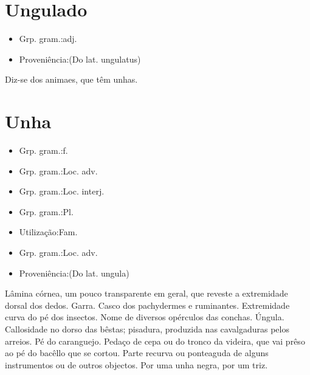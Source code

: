 \documentclass{article}
\begin{document}
\section{Ungulado}
\begin{itemize}
\item {Grp. gram.:adj.}
\end{itemize}
\begin{itemize}
\item {Proveniência:(Do lat. \textunderscore ungulatus\textunderscore )}
\end{itemize}
Diz-se dos animaes, que têm unhas.
\section{Unha}
\begin{itemize}
\item {Grp. gram.:f.}
\end{itemize}
\begin{itemize}
\item {Grp. gram.:Loc. adv.}
\end{itemize}
\begin{itemize}
\item {Grp. gram.:Loc. interj.}
\end{itemize}
\begin{itemize}
\item {Grp. gram.:Pl.}
\end{itemize}
\begin{itemize}
\item {Utilização:Fam.}
\end{itemize}
\begin{itemize}
\item {Grp. gram.:Loc. adv.}
\end{itemize}
\begin{itemize}
\item {Proveniência:(Do lat. \textunderscore ungula\textunderscore )}
\end{itemize}
Lâmina córnea, um pouco transparente em geral, que reveste a extremidade dorsal dos dedos.
Garra.
Casco dos pachydermes e ruminantes.
Extremidade curva do pé dos insectos.
Nome de diversos opérculos das conchas.
Úngula.
Callosidade no dorso das bêstas; pisadura, produzida nas cavalgaduras pelos arreios.
Pé do caranguejo.
Pedaço de cepa ou do tronco da videira, que vai prêso ao pé do bacêllo que se cortou.
Parte recurva ou ponteaguda de alguns instrumentos ou de outros objectos.
\textunderscore Por uma unha negra\textunderscore , por um triz.
\end{document}
